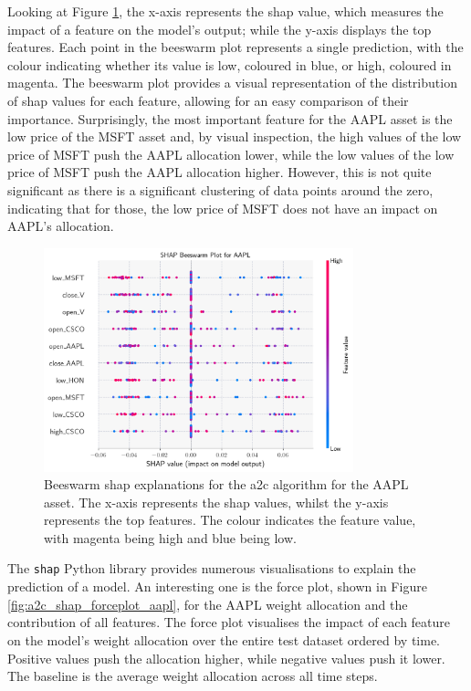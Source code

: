 Looking at Figure \ref{fig:a2c_shap_beeswarm_aapl}, the x-axis represents the \acrshort{shap} value, which measures the impact of a feature on the model's output; while the y-axis displays the top features. Each point in the beeswarm plot represents a single prediction, with the colour indicating whether its value is low, coloured in blue, or high, coloured in magenta. The beeswarm plot provides a visual representation of the distribution of \acrshort{shap} values for each feature, allowing for an easy comparison of their importance. Surprisingly, the most important feature for the AAPL asset is the low price of the MSFT asset and, by visual inspection, the high values of the low price of MSFT push the AAPL allocation lower, while the low values of the low price of MSFT push the AAPL allocation higher. However, this is not quite significant as there is a significant clustering of data points around the zero, indicating that for those, the low price of MSFT does not have an impact on AAPL's allocation. 

\begin{figure}[h]
    \centering
    \includegraphics[width=0.8\textwidth]{figures/a2c_shap_beeswarm_aapl.png}
    \caption{Beeswarm \acrshort{shap} explanations for the \acrshort{a2c} algorithm for the AAPL asset. The x-axis represents the \acrshort{shap} values, whilst the y-axis represents the top features. The colour indicates the feature value, with magenta being high and blue being low.}
    \label{fig:a2c_shap_beeswarm_aapl}
\end{figure}

The \texttt{shap} Python library provides numerous visualisations to explain the prediction of a model. An interesting one is the force plot, shown in Figure \ref{fig:a2c_shap_forceplot_aapl}, for the AAPL weight allocation and the contribution of all features. The force plot visualises the impact of each feature on the model's weight allocation over the entire test dataset ordered by time. Positive values push the allocation higher, while negative values push it lower. The baseline is the average weight allocation across all time steps. 

